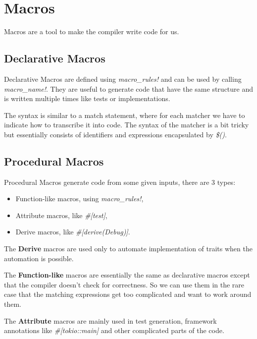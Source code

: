 \section{Macros}

Macros are a tool to make the compiler write code for us.

\subsection{Declarative Macros}

Declarative Macros are defined using \textit{macro\_rules!} and can be used by calling \textit{macro\_name!}.
They are useful to generate code that have the same structure and is written multiple times like tests or implementations.

The syntax is similar to a match statement, where for each matcher we have to indicate how to transcribe it into code.
The syntax of the matcher is a bit tricky but essentially consists of identifiers and expressions encapsulated by \textit{\$()}.

\subsection{Procedural Macros}

Procedural Macros generate code from some given inputs, there are 3 types:
\begin{itemize}
    \item Function-like macros, using \textit{macro\_rules!},
    \item Attribute macros, like \textit{\#[test]},
    \item Derive macros, like \textit{\#[derive(Debug)]}.
\end{itemize}

The \textbf{Derive} macros are used only to automate implementation of traits when the automation is possible.

The \textbf{Function-like} macros are essentially the same as declarative macros except that the compiler doesn't check for correctness.
So we can use them in the rare case that the matching expressions get too complicated and want to work around them.

The \textbf{Attribute} macros are mainly used in test generation, framework annotations like \textit{\#[tokio::main]} and other complicated parts of the code.
